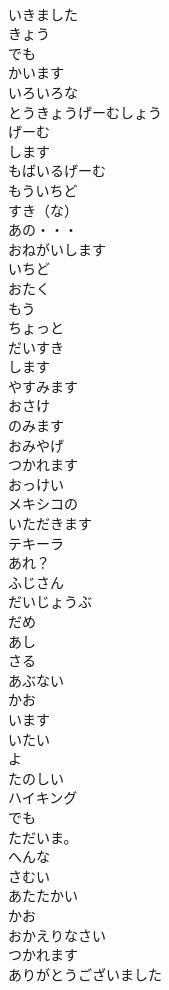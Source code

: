 \documentclass[8pt]{extreport}
\begin{document}
\begin{CJK}{UTF8}{min}
\\	いきました
\\	きょう
\\	でも
\\	かいます
\\	いろいろな
\\	とうきょうげーむしょう
\\	げーむ
\\	します
\\	もばいるげーむ
\\	もういちど
\\	すき（な）
\\	あの・・・
\\	おねがいします
\\	いちど
\\	おたく
\\	もう
\\	ちょっと
\\	だいすき
\\	します
\\	やすみます
\\	おさけ
\\	のみます
\\	おみやげ
\\	つかれます
\\	おっけい
\\	メキシコの
\\	いただきます
\\	テキーラ
\\	あれ？
\\	ふじさん
\\	だいじょうぶ
\\	だめ
\\	あし
\\	さる
\\	あぶない
\\	かお
\\	います
\\	いたい
\\	よ
\\	たのしい
\\	ハイキング
\\	でも
\\	ただいま。
\\	へんな
\\	さむい
\\	あたたかい
\\	かお
\\	おかえりなさい
\\	つかれます
\\	ありがとうございました

\end{CJK}
\end{document}
